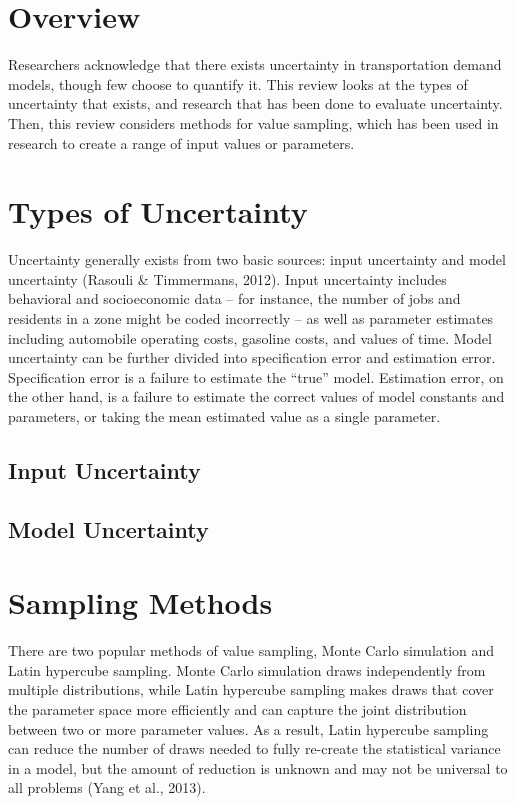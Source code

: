 \documentclass[fancy, masters,twoside]{byuthesis}
\begin{document}
\hypertarget{overview}{%
\section{Overview}\label{overview}}

Researchers acknowledge that there exists uncertainty in transportation demand models, though few choose to quantify it. This review looks at the types of uncertainty that exists, and research that has been done to evaluate uncertainty. Then, this review considers methods for value sampling, which has been used in research to create a range of input values or parameters.

\hypertarget{types-of-uncertainty}{%
\section{Types of Uncertainty}\label{types-of-uncertainty}}

Uncertainty generally exists from two basic sources: input uncertainty and model uncertainty (Rasouli \& Timmermans, 2012). Input uncertainty includes behavioral and socioeconomic data -- for instance, the number of jobs and residents in a zone might be coded incorrectly -- as well as parameter estimates including automobile operating costs, gasoline costs, and values of time. Model uncertainty can be further divided into specification error and estimation error. Specification error is a failure to estimate the ``true'' model. Estimation error, on the other hand, is a failure to estimate the correct values of model constants and parameters, or taking the mean estimated value as a single parameter.

\hypertarget{input-uncertainty}{%
\subsection{Input Uncertainty}\label{input-uncertainty}}

\hypertarget{model-uncertainty}{%
\subsection{Model Uncertainty}\label{model-uncertainty}}

\hypertarget{sampling-methods}{%
\section{Sampling Methods}\label{sampling-methods}}

There are two popular methods of value sampling, Monte Carlo simulation and Latin hypercube sampling. Monte Carlo simulation draws independently from multiple distributions, while Latin hypercube sampling makes draws that cover the parameter space more efficiently and can capture the joint distribution between two or more parameter values. As a result, Latin hypercube sampling can reduce the number of draws needed to fully re-create the statistical variance in a model, but the amount of reduction is unknown and may not be universal to all problems (Yang et al., 2013).
\end{document}
